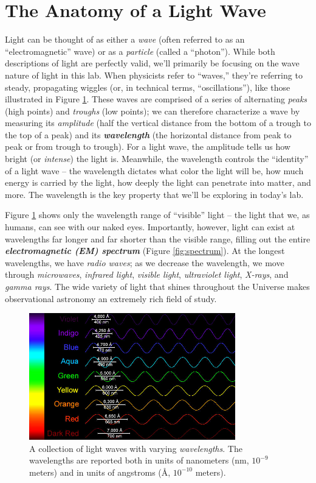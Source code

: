 \documentclass[11pt]{article}
\begin{document}
\section{The Anatomy of a Light Wave}
Light can be thought of as either a \emph{wave} (often referred to as an ``electromagnetic'' wave) or as a \emph{particle} (called a ``photon''). While both descriptions of light are perfectly valid, we'll primarily be focusing on the wave nature of light in this lab. When physicists refer to ``waves,'' they're referring to steady, propagating wiggles (or, in technical terms, ``oscillations''), like those illustrated in Figure \ref{fig:lightwaves}. These waves are comprised of a series of alternating \emph{peaks} (high points) and \emph{troughs} (low points); we can therefore characterize a wave by measuring its \emph{amplitude} (half the vertical distance from the bottom of a trough to the top of a peak) and its \textbf{\emph{wavelength}} (the horizontal distance from peak to peak or from trough to trough). For a light wave, the amplitude tells us how bright (or \emph{intense}) the light is. Meanwhile, the wavelength controls the ``identity'' of a light wave -- the wavelength dictates what color the light will be, how much energy is carried by the light, how deeply the light can penetrate into matter, and more. The wavelength is the key property that we'll be exploring in today's lab.

\medskip \noindent
Figure \ref{fig:lightwaves} shows only the wavelength range of ``visible'' light -- the light that we, as humans, can see with our naked eyes. Importantly, however, light can exist at wavelengths far longer and far shorter than the visible range, filling out the entire \emph{\textbf{electromagnetic (EM) spectrum}} (Figure \ref{fig:spectrum}). At the longest wavelengths, we have \emph{radio waves}; as we decrease the wavelength, we move through \emph{microwaves}, \emph{infrared light}, \emph{visible light}, \emph{ultraviolet light}, \emph{X-rays}, and \emph{gamma rays}. The wide variety of light that shines throughout the Universe makes observational astronomy an extremely rich field of study. 

\begin{figure}[t!]
    \centering
    \includegraphics[width=0.8\textwidth]{Images/light waves.jpg}
    \caption{A collection of light waves with varying \emph{wavelengths}. The wavelengths are reported both in units of nanometers (nm, $10^{-9}$ meters) and in units of angstroms (\AA, $10^{-10}$ meters).}
    \label{fig:lightwaves}
\end{figure}
\end{document}

